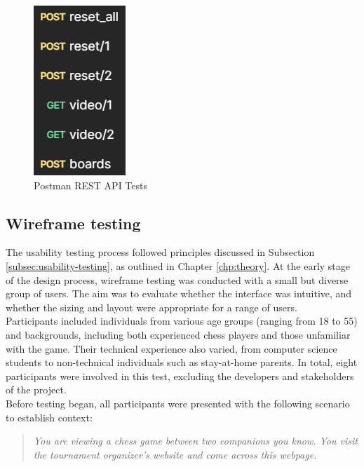 \begin{figure}[h!]
    \centering
    \includegraphics[width=0.25\linewidth]{figures/results/postman.png}
    \caption{Postman REST API Tests}
    \label{fig:postman-rest-tests}
\end{figure}



\subsection{Wireframe testing}
\label{subsubsec:user-centered-design}

The usability testing process followed principles discussed in Subsection \ref{subsec:usability-testing}, as outlined in Chapter \ref{chp:theory}. At the early stage of the design process, wireframe testing was conducted with a small but diverse group of users. The aim was to evaluate whether the interface was intuitive, and whether the sizing and layout were appropriate for a range of users. \\

Participants included individuals from various age groups (ranging from 18 to 55) and backgrounds, including both experienced chess players and those unfamiliar with the game. Their technical experience also varied, from computer science students to non-technical individuals such as stay-at-home parents. In total, eight participants were involved in this test, excluding the developers and stakeholders of the project. \\

Before testing began, all participants were presented with the following scenario to establish context:

\begin{quote}
\textit{You are viewing a chess game between two companions you know. You visit the tournament organizer's website and come across this webpage.}
\end{quote}

